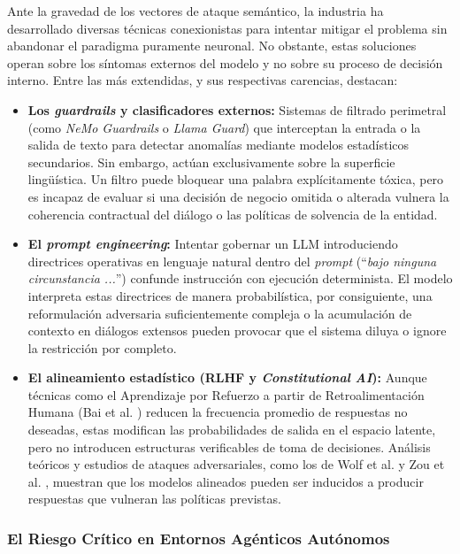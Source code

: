 \documentclass[12pt,a4paper]{report}
\begin{document}
Ante la gravedad de los vectores de ataque semántico, la industria ha desarrollado diversas técnicas conexionistas para intentar mitigar el problema sin abandonar el paradigma puramente neuronal. No obstante, estas soluciones operan sobre los síntomas externos del modelo y no sobre su proceso de decisión interno. Entre las más extendidas, y sus respectivas carencias, destacan:

\begin{itemize}
    \item \textbf{Los \textit{guardrails} y clasificadores externos:} Sistemas de filtrado perimetral (como \textit{NeMo Guardrails} o \textit{Llama Guard}) que interceptan la entrada o la salida de texto para detectar anomalías mediante modelos estadísticos secundarios. Sin embargo, actúan exclusivamente sobre la superficie lingüística. Un filtro puede bloquear una palabra explícitamente tóxica, pero es incapaz de evaluar si una decisión de negocio omitida o alterada vulnera la coherencia contractual del diálogo o las políticas de solvencia de la entidad.
    \item \textbf{El \textit{prompt engineering}:} Intentar gobernar un LLM introduciendo directrices operativas en lenguaje natural dentro del \textit{prompt} (``\textit{bajo ninguna circunstancia ...}'') confunde instrucción con ejecución determinista. El modelo interpreta estas directrices de manera probabilística, por consiguiente, una reformulación adversaria suficientemente compleja o la acumulación de contexto en diálogos extensos pueden provocar que el sistema diluya o ignore la restricción por completo.
    \item \textbf{El alineamiento estadístico (RLHF y \textit{Constitutional AI}):} Aunque técnicas como el Aprendizaje por Refuerzo a partir de Retroalimentación Humana (Bai et al. \cite{bai2022rlhf}) reducen la frecuencia promedio de respuestas no deseadas, estas modifican las probabilidades de salida en el espacio latente, pero no introducen estructuras verificables de toma de decisiones. Análisis teóricos y estudios de ataques adversariales, como los de Wolf et al. \cite{wolf2023alignment} y Zou et al. \cite{zou2023universal}, muestran que los modelos alineados pueden ser inducidos a producir respuestas que vulneran las políticas previstas.
\end{itemize}

\subsubsection{El Riesgo Crítico en Entornos Agénticos Autónomos}
\end{document}
